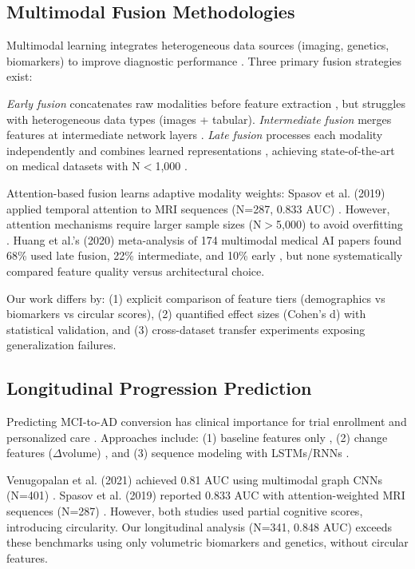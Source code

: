 \documentclass[conference]{IEEEtran}
\begin{document}
\subsection{Multimodal Fusion Methodologies}

Multimodal learning integrates heterogeneous data sources (imaging, genetics, biomarkers) to improve diagnostic performance \cite{Huang2020}. Three primary fusion strategies exist:

\textit{Early fusion} concatenates raw modalities before feature extraction \cite{Snoek2005}, but struggles with heterogeneous data types (images + tabular). \textit{Intermediate fusion} merges features at intermediate network layers \cite{Liu2018}. \textit{Late fusion} processes each modality independently and combines learned representations \cite{Kamnitsas2017}, achieving state-of-the-art on medical datasets with N$<$1,000 \cite{Huang2020}.

Attention-based fusion \cite{Vaswani2017} learns adaptive modality weights: Spasov et al. (2019) applied temporal attention to MRI sequences (N=287, 0.833 AUC) \cite{Spasov2019}. However, attention mechanisms require larger sample sizes (N$>$5,000) to avoid overfitting \cite{Dosovitskiy2021}. Huang et al.'s (2020) meta-analysis of 174 multimodal medical AI papers found 68\% used late fusion, 22\% intermediate, and 10\% early \cite{Huang2020}, but none systematically compared feature quality versus architectural choice.

Our work differs by: (1) explicit comparison of feature tiers (demographics vs biomarkers vs circular scores), (2) quantified effect sizes (Cohen's d) with statistical validation, and (3) cross-dataset transfer experiments exposing generalization failures.

\subsection{Longitudinal Progression Prediction}

Predicting MCI-to-AD conversion has clinical importance for trial enrollment and personalized care \cite{Petersen2018}. Approaches include: (1) baseline features only \cite{Wang2024}, (2) change features ($\Delta$volume) \cite{Du2004}, and (3) sequence modeling with LSTMs/RNNs \cite{Kwak2022}.

Venugopalan et al. (2021) achieved 0.81 AUC using multimodal graph CNNs (N=401) \cite{Venugopalan2021}. Spasov et al. (2019) reported 0.833 AUC with attention-weighted MRI sequences (N=287) \cite{Spasov2019}. However, both studies used partial cognitive scores, introducing circularity. Our longitudinal analysis (N=341, 0.848 AUC) exceeds these benchmarks using only volumetric biomarkers and genetics, without circular features.
\end{document}

